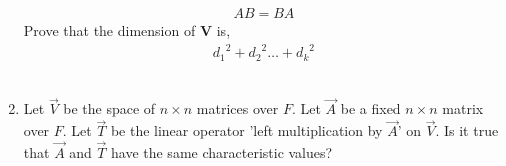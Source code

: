 \begin{enumerate}[label=\thesubsection.\arabic*.,ref=\thesubsection.\theenumi]
\begin{align}
AB = BA \label{eq:solutions/6/2/14/1.2}
\end{align}
Prove that the dimension of $\mathbf{V}$ is,
\begin{align}
{d_1}^2 + {d_2}^2 \dots + {d_k}^2 \label{eq:solutions/6/2/14/1.3}
\end{align}
%
\\
\solution

\item Let $\vec{V}$ be the space of $n \times n$ matrices over $F$. Let $\vec{A}$ be a fixed $n \times n$ matrix over $F$. Let $\vec{T}$ be the linear operator 'left multiplication by $\vec{A}$' on $\vec{V}$. Is it true that $\vec{A}$ and $\vec{T}$ have the same characteristic values?
%
\\
\solution

\end{enumerate}
